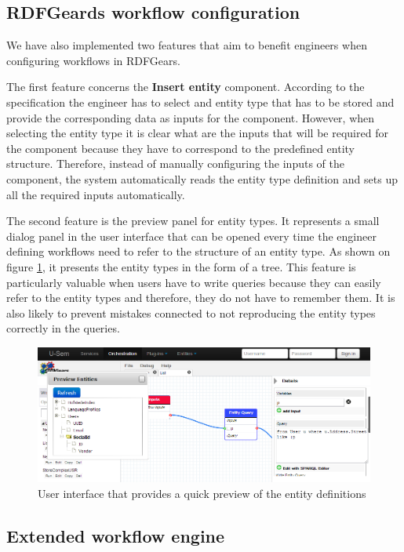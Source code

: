 \subsection{RDFGeards workflow configuration}
We have also implemented two features that aim to benefit engineers when configuring workflows in RDFGears.

The first feature concerns the \textbf{Insert entity} component. According to the specification the engineer has to select and entity type that has to be stored and provide the corresponding data as inputs for the component. However, when selecting the entity type it is clear what are the inputs that will be required for the component because they have to correspond to the predefined entity structure. Therefore, instead of manually configuring the inputs of the component, the system automatically reads the entity type definition and sets up all the required inputs automatically.

The second feature is the preview panel for entity types. It represents a small dialog panel in the user interface that can be opened every time the engineer defining workflows need to refer to the structure of an entity type. As shown on figure \ref{fig:storageEntityPreview}, it presents the entity types in the form of a tree. This feature is particularly valuable when users have to write queries because they can easily refer to the entity types and therefore, they do not have to remember them. It is also likely to prevent mistakes connected to not reproducing the entity types correctly in the queries.

\begin{figure}[h!]
  \centering
  	\includegraphics[scale=0.5]{storage/ui/entityPreview.png}
  \caption{User interface that provides a quick preview of the entity definitions}
  \label{fig:storageEntityPreview}
\end{figure}

\subsection{Extended workflow engine}

